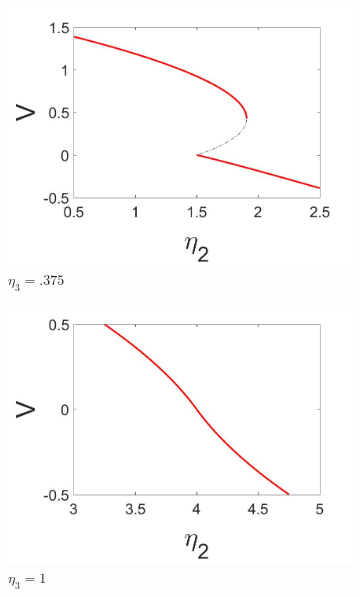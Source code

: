 \begin{figure}[H]
\centering
\begin{subfigure}{.5\textwidth}
  \centering
  \includegraphics[width=\linewidth]{intro/V_bif.jpg}
  \caption{$\eta_3=.375$}
\end{subfigure}%
\begin{subfigure}{.5\textwidth}
  \centering
  \includegraphics[width=\linewidth]{intro/V_bif_collapse.jpg}
  \caption{$\eta_3=1$}
\end{subfigure}
\begin{subfigure}{.5\textwidth}
  \centering

\end{subfigure}
\end{figure}
